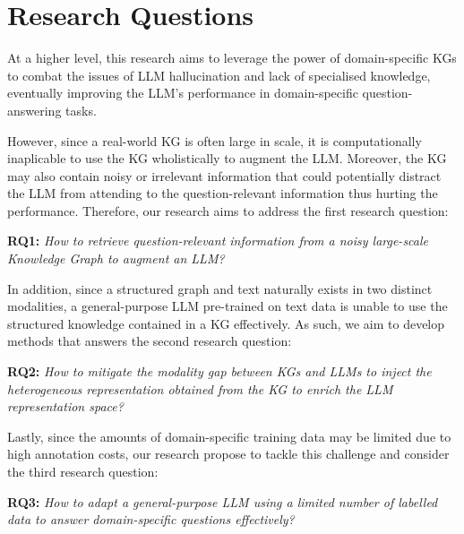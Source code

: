 \section*{Research Questions}

At a higher level, this research aims to leverage the power of domain-specific KGs to combat the issues of LLM hallucination and lack of specialised knowledge, eventually improving the LLM's performance in domain-specific question-answering tasks.

However, since a real-world KG is often large in scale, it is computationally inaplicable to use the KG wholistically to augment the LLM.
Moreover, the KG may also contain noisy or irrelevant information that could potentially distract the LLM from attending to the question-relevant information thus hurting the performance. 
Therefore, our research aims to address the first research question:

\textbf{RQ1:} \emph{How to retrieve question-relevant information from a noisy large-scale Knowledge Graph to augment an LLM?}

In addition, since a structured graph and text naturally exists in two distinct modalities, a general-purpose LLM pre-trained on text data is unable to use the structured knowledge contained in a KG effectively. 
As such, we aim to develop methods that answers the second research question:

\textbf{RQ2:} \emph{How to mitigate the modality gap between KGs and LLMs to inject the heterogeneous representation obtained from the KG to enrich the LLM representation space?}

Lastly, since the amounts of domain-specific training data may be limited due to high annotation costs, our research propose to tackle this challenge and consider the third research question:

\textbf{RQ3:} \emph{How to adapt a general-purpose LLM using a limited number of labelled data to answer domain-specific questions effectively?}


